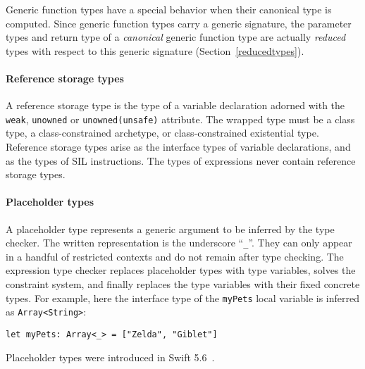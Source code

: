 \documentclass[../generics]{subfiles}
\begin{document}
Generic function types have a special behavior when their canonical type is computed. Since generic function types carry a generic signature, the parameter types and return type of a \emph{canonical} generic function type are actually \emph{reduced} types with respect to this generic signature (Section~\ref{reducedtypes}).

\paragraph{Reference storage types}
A reference storage type is the type of a variable declaration adorned with the \texttt{weak}, \texttt{unowned} or \texttt{unowned(unsafe)} attribute. The wrapped type must be a class type, a class-constrained archetype, or class-constrained existential type. Reference storage types arise as the interface types of variable declarations, and as the types of SIL instructions. The types of expressions never contain reference storage types.

\paragraph{Placeholder types}
A placeholder type represents a generic argument to be inferred by the type checker. The written representation is the underscore ``\texttt{\_}''. They can only appear in a handful of restricted contexts and do not remain after type checking. The expression type checker replaces placeholder types with type variables, solves the constraint system, and finally replaces the type variables with their fixed concrete types. For example, here the interface type of the \texttt{myPets} local variable is inferred as \texttt{Array<String>}:
\begin{Verbatim}
let myPets: Array<_> = ["Zelda", "Giblet"]
\end{Verbatim}
Placeholder types were introduced in Swift 5.6~\cite{se0315}.
\end{document}
